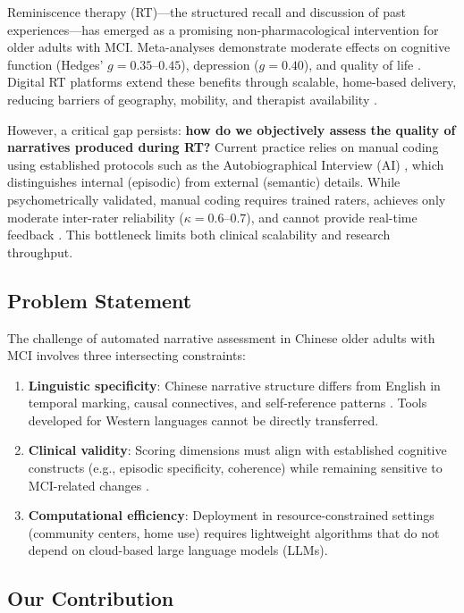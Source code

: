 \documentclass[11pt]{article}
\begin{document}
Reminiscence therapy (RT)—the structured recall and discussion of past experiences—has emerged as a promising non-pharmacological intervention for older adults with MCI. Meta-analyses demonstrate moderate effects on cognitive function (Hedges' $g = 0.35$--$0.45$), depression ($g = 0.40$), and quality of life \cite{woods2018, johnson2020}. Digital RT platforms extend these benefits through scalable, home-based delivery, reducing barriers of geography, mobility, and therapist availability \cite{gonzalez2021}.

However, a critical gap persists: \textbf{how do we objectively assess the quality of narratives produced during RT?} Current practice relies on manual coding using established protocols such as the Autobiographical Interview (AI) \cite{levine2002}, which distinguishes internal (episodic) from external (semantic) details. While psychometrically validated, manual coding requires trained raters, achieves only moderate inter-rater reliability ($\kappa = 0.6$--$0.7$), and cannot provide real-time feedback \cite{rosenbaum2020}. This bottleneck limits both clinical scalability and research throughput.

\subsection{Problem Statement}

The challenge of automated narrative assessment in Chinese older adults with MCI involves three intersecting constraints:

\begin{enumerate}
  \item \textbf{Linguistic specificity}: Chinese narrative structure differs from English in temporal marking, causal connectives, and self-reference patterns \cite{chen2019}. Tools developed for Western languages cannot be directly transferred.
  \item \textbf{Clinical validity}: Scoring dimensions must align with established cognitive constructs (e.g., episodic specificity, coherence) while remaining sensitive to MCI-related changes \cite{murphy2021}.
  \item \textbf{Computational efficiency}: Deployment in resource-constrained settings (community centers, home use) requires lightweight algorithms that do not depend on cloud-based large language models (LLMs).
\end{enumerate}

\subsection{Our Contribution}
\end{document}
